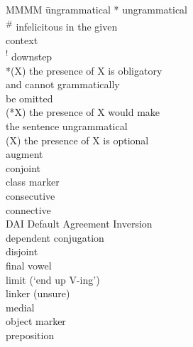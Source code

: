 \documentclass[output=paper]{langscibook}
\begin{document}
\begin{multicols}{2}
\begin{tabbing}
MMMM \= ungrammatical\kill
* \> ungrammatical\\
\textsuperscript{\#} \> infelicitous in the given \\ \> context\\
\textsuperscript{!} \> downstep\\
*(X) \> the presence of X is obligatory \\ \> and cannot grammatically \\ \> be omitted\\
(*X) \> the presence of X would make \\ \> the sentence ungrammatical\\
(X) \> the presence of X is optional\\
\AUG{} \> augment \\
\CJ{} \> conjoint\\
\CL{} \> class marker\\
\CON{} \> consecutive\\
\CONN{} \> connective\\
DAI \> Default Agreement Inversion\\
\DEP{} \> dependent conjugation\\
\DJ{} \> disjoint\\
\FV{} \> final vowel\\
\LIM{} \> limit (‘end up V-ing’)\\
\LINK{} \> linker (unsure)\\
\MED{} \> medial\\
\OM{} \> object marker\\
\PREP{} \> preposition\\

\end{tabbing}
\end{multicols}
\end{document}

